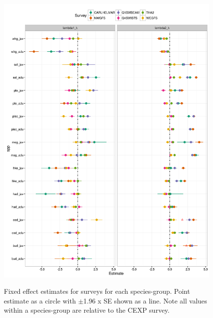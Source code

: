 \documentclass{article}
\begin{document}
\begin{figure}[!ht]
\begin{center}
	\includegraphics[width = 0.9\linewidth]{"figures/Suppl - QEstimatesALL"}
	\label{fig:S11}
	\caption{Fixed effect estimates for surveys for each species-group.
		Point estimate as a circle with $\pm$1.96 x SE shown as a line.
		Note all values within a species-group are relative to the CEXP
		survey.}
	\end{center}
\end{figure}
\end{document}
